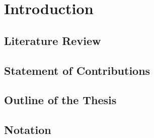 

\chapter{Introduction}
\section{Literature Review}

\section{Statement of Contributions}

\section{Outline of the Thesis}

\section{Notation}


